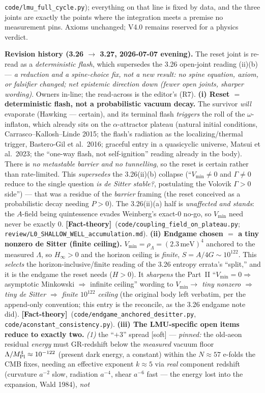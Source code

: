 \documentclass[11pt]{article}
\newcommand{\factth}{\textcolor{green!40!black}{\textbf{[Fact-theory]}}}
\begin{document}
{\texttt{code/lmu\_full\_cycle.py}); everything on that line is fixed by data, and the three joints are exactly the points where the integration meets a premise no measurement pins. Axioms unchanged; V4.0 remains reserved for a physics verdict.

\smallskip\noindent\textbf{Revision history (3.26 $\to$ 3.27, 2026-07-07 evening).} The reset joint is re-read as a \emph{deterministic flash}, which supersedes the 3.26 open-joint reading (ii)(b) --- \emph{a reduction and a spine-choice fix, not a new result: no spine equation, axiom, or falsifier changed; net epistemic direction down (fewer open joints, sharper wording)}. Owners in-line; the read-across is the editor's (R7). \textbf{(i) Reset $=$ deterministic flash, not a probabilistic vacuum decay.} The survivor \emph{will} evaporate (Hawking --- certain), and its terminal flash \emph{triggers} the roll of the $\omega$-inflaton, which already sits on the $\alpha$-attractor plateau (natural initial conditions, Carrasco--Kallosh--Linde 2015; the flash's radiation as the localizing/thermal trigger, Bastero-Gil et al.\ 2016; graceful entry in a quasicyclic universe, Matsui et al.\ 2023; the ``one-way flash, not self-ignition'' reading already in the body). There is \emph{no metastable barrier and no tunnelling}, so the reset is certain rather than rate-limited. This \emph{supersedes} the 3.26(ii)(b) collapse (``$V_{\min}\neq0$ and $\Gamma\neq0$ reduce to the single question \emph{is de Sitter stable?}, postulating the Volovik $\Gamma>0$ side'') --- that was a residue of the \emph{barrier} framing (the reset conceived as a probabilistic decay needing $P>0$). The 3.26(ii)(a) half is \emph{unaffected and stands}: the $A$-field being quintessence evades Weinberg's exact-$0$ no-go, so $V_{\min}$ need never be exactly $0$. \factth\ (\texttt{code/coupling\_field\_on\_plateau.py}; \texttt{review/L0\_SHALLOW\_WELL\_accumulation.md}). \textbf{(ii) Endgame chosen $=$ a tiny nonzero de Sitter (finite ceiling).} $V_{\min}=\rho_\Lambda=(2.3\,\mathrm{meV})^4$ anchored to the measured $\Lambda$, so $H_\infty>0$ and the horizon ceiling is \emph{finite}, $S=A/4G\sim10^{122}$. This \emph{selects} the horizon-inclusive/finite reading of the 3.26 entropy errata's ``split,'' and it is the endgame the reset needs ($H>0$). It \emph{sharpens} the Part~II ``$V_{\min}=0\Rightarrow$ asymptotic Minkowski $\Rightarrow$ infinite ceiling'' wording to \emph{$V_{\min}\to$ tiny nonzero $\Rightarrow$ tiny de Sitter $\Rightarrow$ finite $10^{122}$ ceiling} (the original body left verbatim, per the append-only convention; this entry is the reconcile, as the 3.26 endgame note did). \factth\ (\texttt{code/endgame\_anchored\_desitter.py}, \texttt{code/aconstant\_consistency.py}). \textbf{(iii) The LMU-specific open items reduce to exactly two.} \emph{(1)} the ``$+3$'' spread [soft] --- \emph{pinned:} the old-aeon residual \emph{energy} must GR-redshift below the \emph{measured} vacuum floor $\Lambda/M_{\rm Pl}^4\approx10^{-122}$ (present dark energy, a constant) within the $N\approx57$ e-folds the CMB fixes, needing an effective exponent $k\approx5$ via \emph{real} component redshift (curvature $a^{-2}$ slow, radiation $a^{-4}$, shear $a^{-6}$ fast --- the energy lost into the expansion, Wald 1984), \emph{not} }
\end{document}
